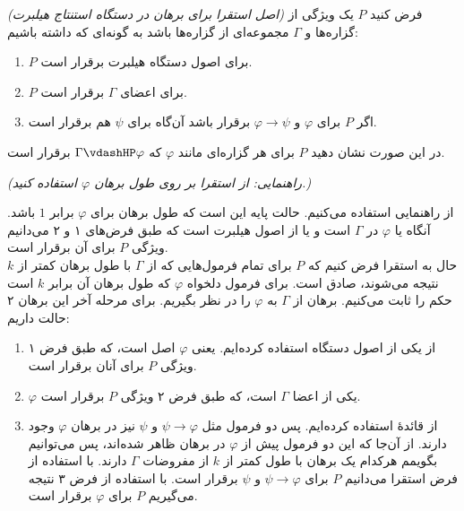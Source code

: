 \emph{(اصل استقرا برای برهان در دستگاه استنتاج هیلبرت) }
	فرض کنید $P$ یک ویژگی از گزاره‌ها و $\Gamma$ مجموعه‌ای از گزاره‌ها باشد به گونه‌ای که داشته باشیم:
	\begin{enumerate}
		\item $P$ برای اصول دستگاه هیلبرت برقرار است.
		\item $P$ برای اعضای $\Gamma$ برقرار است.
		\item اگر $P$ برای $\varphi$ و $\varphi \rightarrow \psi$ برقرار باشد آن‌گاه برای $\psi$ هم برقرار است.
	\end{enumerate}
	در این صورت نشان دهید $P$ برای هر گزاره‌ای مانند $\varphi$ که $\Gamma \vdashHP \varphi$ برقرار است.
	
	\emph{(راهنمایی: از استقرا بر روی طول برهان $\varphi$ استفاده کنید.)}
	
	\quad\vspace {0.5cm}
	\begin{ans}
		از راهنمایی استفاده می‌کنیم. حالت پایه این است که طول برهان برای 
		$\varphi$
		برابر $1$ باشد.
		آنگاه یا 
		$\varphi$
		در 
		$\Gamma$
		است و یا از اصول هیلبرت است که طبق فرض‌های ۱ و ۲ می‌دانیم ویژگی $P$ برای آن برقرار است.\\
		حال به استقرا فرض کنیم که $P$ برای تمام فرمول‌هایی که از 
		$\Gamma$
		با طول برهان کمتر از $k$ نتیجه می‌شوند، صادق است. برای فرمول دلخواه 
		$\varphi$
		که طول برهان آن برابر $k$ است حکم را ثابت می‌کنیم.
		برهان از 
		$\Gamma$
		 به 
		$\varphi$
		را در نظر بگیریم. برای مرحله آخر این برهان ۲ حالت داریم:
		\quad\vspace{0.5cm}
		\begin{enumerate}
			\item از یکی از اصول دستگاه استفاده کرده‌ایم. یعنی $\varphi$ اصل است، که طبق فرض ۱ ویژگی $P$ برای آنان برقرار است.
			\item $\varphi$ یکی از اعضا 
			$\Gamma$
			است، که طبق فرض ۲ ویژگی $P$ برقرار است. 
			\item از قائدهٔ 
			استفاده کرده‌ایم. پس دو فرمول مثل $\psi \rightarrow \varphi$ و $\psi$ نیز در برهان $\varphi$ وجود دارند.
			از آن‌جا که این دو فرمول پیش از $\varphi$ در برهان ظاهر شده‌اند، پس می‌توانیم بگویمم هرکدام یک برهان با طول کمتر از $k$ از مفروضات $\Gamma$ دارند. با استفاده از فرض استقرا می‌دانیم $P$ برای $\psi \rightarrow \varphi$ و $\psi$ برقرار است. با استفاده از فرض ۳ نتیجه می‌گیریم $P$ برای $\varphi$ برقرار است.
		\end{enumerate}
	\end{ans}	
